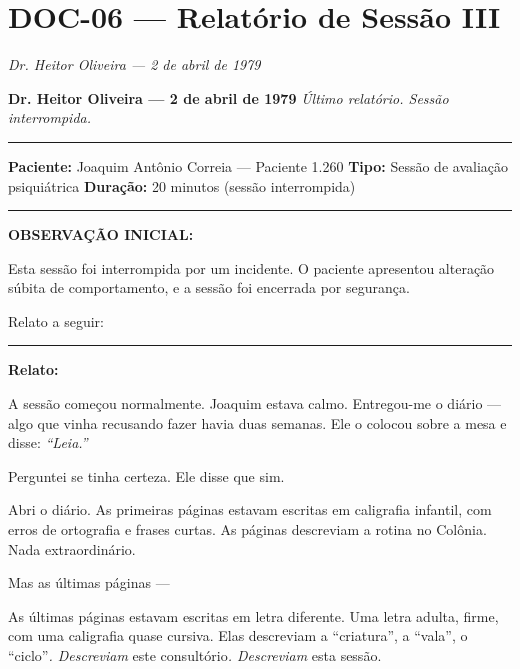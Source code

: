 \section*{\textbf{DOC-06} --- Relatório de Sessão III}

\noindent \textit{Dr. Heitor Oliveira --- 2 de abril de 1979}

\noindent \textbf{Dr. Heitor Oliveira --- 2 de abril de 1979}
\textit{Último relatório. Sessão interrompida.}

\vspace{0.5em}\noindent\rule{\textwidth}{0.5pt}\vspace{0.5em}

\noindent \textbf{Paciente:} Joaquim Antônio Correia --- Paciente 1.260
\textbf{Tipo:} Sessão de avaliação psiquiátrica
\textbf{Duração:} 20 minutos (sessão interrompida)

\vspace{0.5em}\noindent\rule{\textwidth}{0.5pt}\vspace{0.5em}

\noindent \textbf{OBSERVAÇÃO INICIAL:}

\noindent Esta sessão foi interrompida por um incidente. O paciente apresentou alteração súbita de comportamento, e a sessão foi encerrada por segurança.

\noindent Relato a seguir:

\vspace{0.5em}\noindent\rule{\textwidth}{0.5pt}\vspace{0.5em}

\noindent \textbf{Relato:}

\noindent A sessão começou normalmente. Joaquim estava calmo. Entregou-me o diário --- algo que vinha recusando fazer havia duas semanas. Ele o colocou sobre a mesa e disse: \textit{\textquotedblleft{}Leia.\textquotedblright{}}

\noindent Perguntei se tinha certeza. Ele disse que sim.

\noindent Abri o diário. As primeiras páginas estavam escritas em caligrafia infantil, com erros de ortografia e frases curtas. As páginas descreviam a rotina no Colônia. Nada extraordinário.

\noindent Mas as últimas páginas ---

\noindent As últimas páginas estavam escritas em letra diferente. Uma letra adulta, firme, com uma caligrafia quase cursiva. Elas descreviam a \textquotedblleft{}criatura\textquotedblright{}, a \textquotedblleft{}vala\textquotedblright{}, o \textquotedblleft{}ciclo\textquotedblright{\textit{. Descreviam }este consultório\textit{. Descreviam }esta sessão}.

